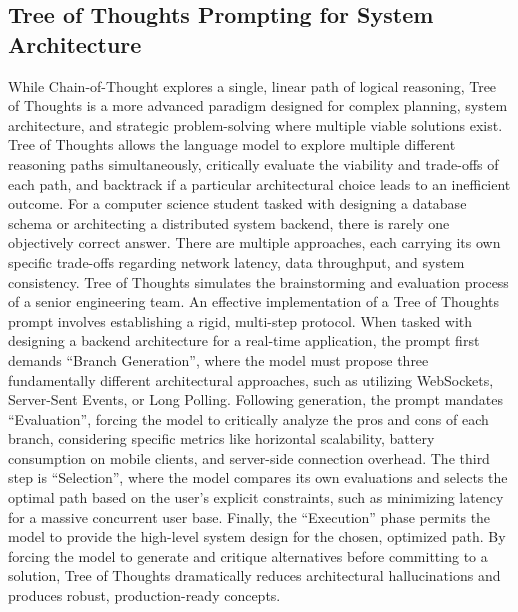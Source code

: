 \documentclass[12pt]{article}
\begin{document}
\subsection{Tree of Thoughts Prompting for System Architecture}
While Chain-of-Thought explores a single, linear path of logical reasoning, Tree of
Thoughts is a more advanced paradigm designed for complex planning, system architecture, and strategic
problem-solving where multiple viable solutions exist. Tree of Thoughts allows the language model to explore
multiple different reasoning paths simultaneously, critically evaluate the viability and trade-offs of each
path, and backtrack if a particular architectural choice leads to an inefficient outcome. For a computer science
student tasked with designing a database schema or architecting a distributed system backend, there is rarely
one objectively correct answer. There are multiple approaches, each carrying its own specific trade-offs
regarding network latency, data throughput, and system consistency. Tree of Thoughts simulates the
brainstorming and evaluation process of a senior engineering team. An effective implementation of a Tree of
Thoughts prompt involves establishing a rigid, multi-step protocol. When tasked with designing a backend
architecture for a real-time application, the prompt first demands ``Branch Generation'', where the model must
propose three fundamentally different architectural approaches, such as utilizing WebSockets, Server-Sent
Events, or Long Polling. Following generation, the prompt mandates ``Evaluation'', forcing the model to
critically analyze the pros and cons of each branch, considering specific metrics like horizontal scalability,
battery consumption on mobile clients, and server-side connection overhead. The third step is ``Selection'',
where the model compares its own evaluations and selects the optimal path based on the user's explicit
constraints, such as minimizing latency for a massive concurrent user base. Finally, the ``Execution'' phase
permits the model to provide the high-level system design for the chosen, optimized path. By forcing the model
to generate and critique alternatives before committing to a solution, Tree of Thoughts dramatically reduces
architectural hallucinations and produces robust, production-ready concepts.
\end{document}
